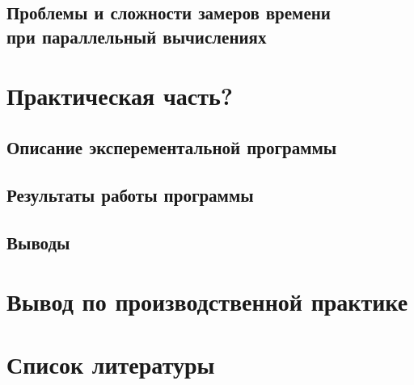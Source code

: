 \documentclass{article}
\begin{document}
		\subsection{Проблемы и сложности замеров времени \\ при параллельный вычислениях}
	\newpage
	\section{Практическая часть?}
		\subsection{Описание эксперементальной программы}
		\subsection{Результаты работы программы}
		\subsection{Выводы}
	\newpage
	\section{Вывод по производственной практике}
	\newpage
	\section{Список литературы}
\end{document}
